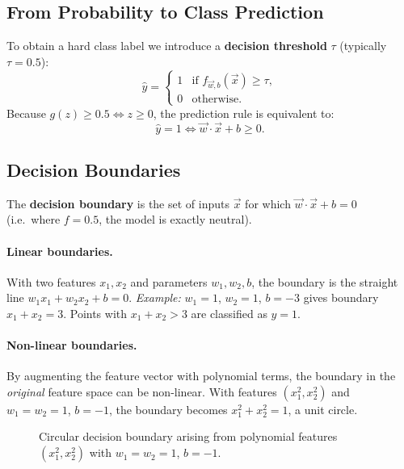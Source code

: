 \subsection{From Probability to Class Prediction}

To obtain a hard class label we introduce a \textbf{decision threshold}
$\tau$ (typically $\tau=0.5$):
\[
\hat{y}=\begin{cases}1&\text{if }f_{\vec{w},b}(\vec{x})\ge\tau,\\
0&\text{otherwise.}\end{cases}
\]
Because $g(z)\ge 0.5\iff z\ge 0$, the prediction rule is equivalent to:
\[\hat{y}=1\iff\vec{w}\cdot\vec{x}+b\ge 0.\]

\subsection{Decision Boundaries}

The \textbf{decision boundary} is the set of inputs $\vec{x}$ for which
$\vec{w}\cdot\vec{x}+b=0$ (i.e.\ where $f=0.5$, the model is exactly neutral).

\paragraph{Linear boundaries.}
With two features $x_1,x_2$ and parameters $w_1,w_2,b$, the boundary is the
straight line $w_1 x_1+w_2 x_2+b=0$.
\textit{Example:} $w_1=1$, $w_2=1$, $b=-3$ gives boundary $x_1+x_2=3$.
Points with $x_1+x_2>3$ are classified as $y=1$.

\paragraph{Non-linear boundaries.}
By augmenting the feature vector with polynomial terms, the boundary in the
\emph{original} feature space can be non-linear. With features
$(x_1^2,x_2^2)$ and $w_1=w_2=1$, $b=-1$, the boundary becomes
$x_1^2+x_2^2=1$, a unit circle.

\begin{figure}[h]
\centering
{}
\caption{Circular decision boundary arising from polynomial features
$(x_1^2,x_2^2)$ with $w_1=w_2=1$, $b=-1$.}
\label{fig:circle-boundary}
\end{figure}


